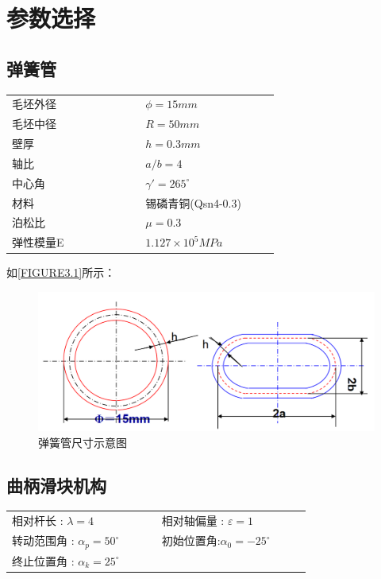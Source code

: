 \section{参数选择}
\subsection{弹簧管}
\begin{tabular}{@{}>{\raggedright\arraybackslash}p{0.4\linewidth}>{\centering\arraybackslash}p{0.4\linewidth}@{}}
    毛坯外径 & $\phi = 15mm$ \\
    毛坯中径 & $R = 50mm$ \\
    壁厚 & $h = 0.3mm$ \\
    轴比 & $a/b = 4$ \\
    中心角 & $\gamma' = 265^\circ$ \\
    材料 & 锡磷青铜(Qsn4-0.3) \\
    泊松比 & $\mu = 0.3$ \\
    弹性模量E & $1.127 \times 10^5MPa$
\end{tabular}
\newline

如\autoref{FIGURE3.1}所示：
\begin{figure}[!htbp]
    \centering
    \includegraphics[width =\textwidth]{figures/3.1.png}
    \caption{弹簧管尺寸示意图}
    \label{FIGURE3.1}
\end{figure}
\subsection{曲柄滑块机构}
\begin{tabular}{@{}>{\raggedright\arraybackslash}p{0.4\linewidth}>{\raggedright\arraybackslash}p{0.4\linewidth}@{}}
相对杆长 : $\lambda=4$ &相对轴偏量 : $\varepsilon=1$\\
转动范围角 : $\alpha_p=50^\circ$ &初始位置角:$\alpha_0=-25^\circ$\\
终止位置角 : $\alpha_k=25^\circ$ &
\end{tabular}
